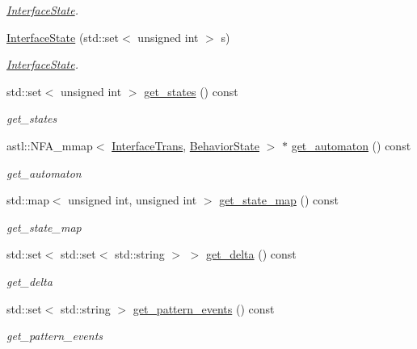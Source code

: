 \begin{DoxyCompactItemize}
\begin{DoxyCompactList}\small\item\em \hyperlink{class_interface_state}{Interface\+State}. \end{DoxyCompactList}\item 
\hyperlink{class_interface_state_ae7782383d9858e5827bbcfb585fc85f2}{Interface\+State} (std\+::set$<$ unsigned int $>$ s)
\begin{DoxyCompactList}\small\item\em \hyperlink{class_interface_state}{Interface\+State}. \end{DoxyCompactList}\item 
std\+::set$<$ unsigned int $>$ \hyperlink{class_interface_state_ab464b8057b2dbcd3f95fd3dfa77acbc1}{get\+\_\+states} () const 
\begin{DoxyCompactList}\small\item\em get\+\_\+states \end{DoxyCompactList}\item 
astl\+::\+N\+F\+A\+\_\+mmap$<$ \hyperlink{class_interface_trans}{Interface\+Trans}, \hyperlink{class_behavior_state}{Behavior\+State} $>$ $\ast$ \hyperlink{class_interface_state_a0c716e3e6e850295bfb3ee8f76c92e44}{get\+\_\+automaton} () const 
\begin{DoxyCompactList}\small\item\em get\+\_\+automaton \end{DoxyCompactList}\item 
std\+::map$<$ unsigned int, unsigned int $>$ \hyperlink{class_interface_state_a5e40775c54082e093b709f064dafaf2c}{get\+\_\+state\+\_\+map} () const 
\begin{DoxyCompactList}\small\item\em get\+\_\+state\+\_\+map \end{DoxyCompactList}\item 
std\+::set$<$ std\+::set$<$ std\+::string $>$ $>$ \hyperlink{class_interface_state_a02d620775d622a72f902a2cbbedc1b42}{get\+\_\+delta} () const 
\begin{DoxyCompactList}\small\item\em get\+\_\+delta \end{DoxyCompactList}\item 
std\+::set$<$ std\+::string $>$ \hyperlink{class_interface_state_a9cdd9aa165b92eb3e0f75091cb2b3155}{get\+\_\+pattern\+\_\+events} () const 
\begin{DoxyCompactList}\small\item\em get\+\_\+pattern\+\_\+events \end{DoxyCompactList}\item 

\end{DoxyCompactItemize}
